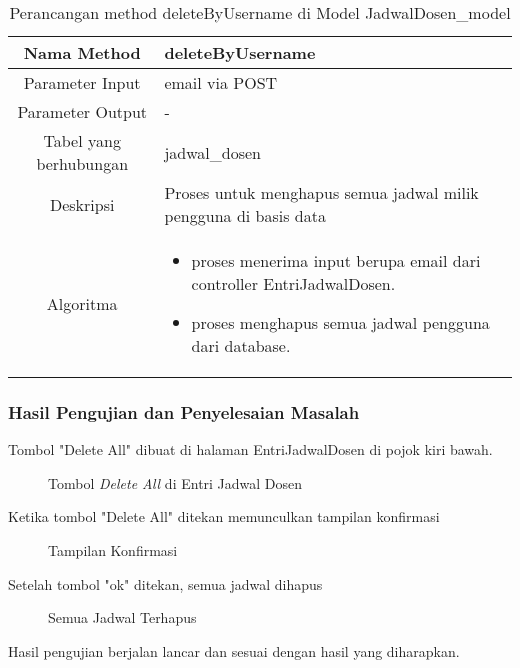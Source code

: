 \begin{center}
\begin{table}[H]
\caption{Perancangan method deleteByUsername di Model JadwalDosen\_model}
\begin{tabular}{|c|p{11cm}|}
\hline
Nama Method 	& 	deleteByUsername 	\\
\hline
Parameter Input & email via POST \\
\hline
Parameter Output & - \\
\hline
Tabel yang berhubungan & jadwal\_dosen \\
\hline
Deskripsi	& Proses untuk menghapus semua jadwal milik pengguna di basis data\\
\hline
Algoritma	& \begin{itemize}
				\item proses menerima input berupa email dari controller EntriJadwalDosen.
				\item proses menghapus semua jadwal pengguna dari database.
				\end{itemize} \\
\hline
\end{tabular}
\end{table}
\end{center}

\subsubsection{Hasil Pengujian dan Penyelesaian Masalah}
Tombol "Delete All" dibuat di halaman EntriJadwalDosen di pojok kiri bawah.
\begin{figure} [H]
	\centering  
	\caption[Tombol \textit{Delete All} di Entri Jadwal Dosen]{Tombol \textit{Delete All} di Entri Jadwal Dosen} 
\end{figure}
Ketika tombol "Delete All" ditekan memunculkan tampilan konfirmasi
\begin{figure} [H]
	\centering  
	\caption[Tampilan Konfirmasi]{Tampilan Konfirmasi} 
\end{figure}
Setelah tombol "ok" ditekan, semua jadwal dihapus
\begin{figure} [H]
	\centering  
	\caption[Semua Jadwal Terhapus]{Semua Jadwal Terhapus} 
\end{figure}
Hasil pengujian berjalan lancar dan sesuai dengan hasil yang diharapkan.

